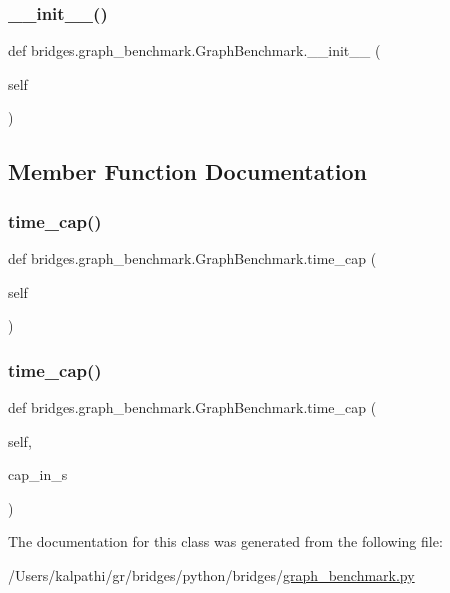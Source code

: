 \subsubsection{\texorpdfstring{\_\_init\_\_()}{\_\_init\_\_()}}
{\footnotesize\ttfamily def bridges.\+graph\+\_\+benchmark.\+Graph\+Benchmark.\+\_\+\+\_\+init\+\_\+\+\_\+ (\begin{DoxyParamCaption}\item[{}]{self }\end{DoxyParamCaption})}



\subsection{Member Function Documentation}
\mbox{\label{classbridges_1_1graph__benchmark_1_1_graph_benchmark_a566f3fa801aaa5ea87752ebcf37d7744}} 
\subsubsection{\texorpdfstring{time\_cap()}{time\_cap()}\hspace{0.1cm}{\footnotesize\ttfamily [1/2]}}
{\footnotesize\ttfamily def bridges.\+graph\+\_\+benchmark.\+Graph\+Benchmark.\+time\+\_\+cap (\begin{DoxyParamCaption}\item[{}]{self }\end{DoxyParamCaption})}

\mbox{\label{classbridges_1_1graph__benchmark_1_1_graph_benchmark_a4a3b4a03513c996c6ed20c7d163fe621}} 
\subsubsection{\texorpdfstring{time\_cap()}{time\_cap()}\hspace{0.1cm}{\footnotesize\ttfamily [2/2]}}
{\footnotesize\ttfamily def bridges.\+graph\+\_\+benchmark.\+Graph\+Benchmark.\+time\+\_\+cap (\begin{DoxyParamCaption}\item[{}]{self,  }\item[{}]{cap\+\_\+in\+\_\+s }\end{DoxyParamCaption})}



The documentation for this class was generated from the following file\+:\begin{DoxyCompactItemize}
\item 
/\+Users/kalpathi/gr/bridges/python/bridges/\mbox{\hyperlink{graph__benchmark_8py}{graph\+\_\+benchmark.\+py}}\end{DoxyCompactItemize}
